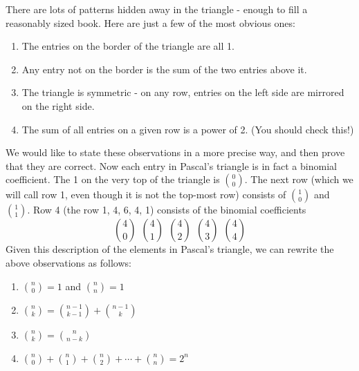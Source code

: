 \documentclass[12pt]{article}
\begin{document}
\begin{center}
\noindent{}

\end{center}

There are lots of patterns hidden away in the triangle - enough to fill a reasonably sized book.  Here are just a few of the most obvious ones:
\begin{enumerate}
  \item The entries on the border of the triangle are all 1.
  \item Any entry not on the border is the sum of the two entries above it.
  \item The triangle is symmetric - on any row, entries on the left side are mirrored on the right side.
  \item The sum of all entries on a given row is a power of 2. (You should check this!)
\end{enumerate}

We would like to state these observations in a more precise way, and then prove that they are correct.  Now each entry in Pascal's triangle is in fact a binomial coefficient.  The 1 on the very top of the triangle is ${0 \choose 0}$.  The next row (which we will call row 1, even though it is not the top-most row) consists of ${1 \choose 0}$ and ${1 \choose 1}$.  Row 4 (the row 1, 4, 6, 4, 1) consists of the binomial coefficients
\[{4 \choose 0} ~~ {4 \choose 1} ~~ {4 \choose 2} ~~ {4 \choose 3} ~~ {4 \choose 4}\]
Given this description of the elements in Pascal's triangle, we can rewrite the above observations as follows:
\begin{enumerate}
  \item ${n \choose 0} = 1$ and ${n \choose n} = 1$
  \item ${n \choose k} = {n-1 \choose k-1} + {n-1 \choose k}$
  \item ${n \choose k} = {n \choose n-k}$
  \item ${n\choose 0} + {n \choose 1} + {n \choose 2} + \cdots + {n \choose n} = 2^n$
\end{enumerate}
\end{document}
